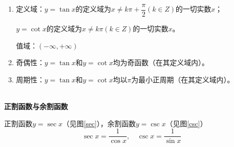\begin{figure}[H]
\begin{minipage}{0.4\linewidth}
    \caption{} \label{cot}
\end{minipage}
\end{figure}

\begin{note}
    \begin{enumerate}
        \item 定义域：$y=\tan x$的定义域为$x\neq k\pi+\dfrac{\pi}{2}(k\in Z)$的一切实数$x$；
        \vspace{2mm}

        $y=\cot x$的定义域为$x\neq k\pi(k\in Z)$的一切实数$x$。

        值域：$(-\infty,+\infty)$

        \item 奇偶性：$y=\tan x$和$y=\cot x$均为奇函数（在其定义域内）。

        \item 周期性：$y=\tan x$和$y=\cot x$均以$\pi$为最小正周期（在其定义域内）。
    \end{enumerate}
\end{note}
~\\

\textbf{正割函数与余割函数}

正割函数$y=\sec x$（见图\ref{sec}），余割函数$y=\csc x$（见图\ref{csc}）
\begin{equation}
    \sec x = \dfrac{1}{\cos x}, \quad \csc x = \dfrac{1}{\sin x} \nonumber
\end{equation}

